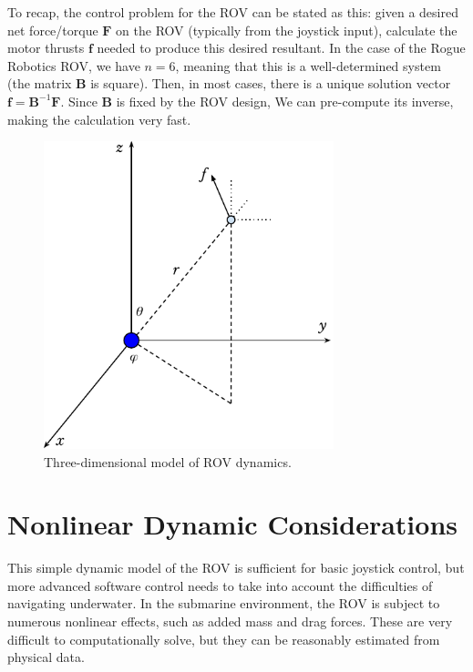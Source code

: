 \documentclass{article}
\renewcommand{\vec}[1]{\mathbf{#1}}
\newcommand{\inv}[1]{#1^{-1}}
\begin{document}
To recap, the control problem for the ROV can be stated as this: given a desired net force/torque $\vec{F}$ on the ROV (typically from the joystick input), calculate the motor thrusts $\vec{f}$ needed to produce this desired resultant. In the case of the Rogue Robotics ROV, we have $n=6$, meaning that this is a well-determined system (the matrix $\vec{B}$ is square). Then, in most cases, there is a unique solution vector $\vec{f} = \inv{\vec{B}}\vec{F}$. Since $\vec{B}$ is fixed by the ROV design, We can pre-compute its inverse, making the calculation very fast.

\begin{figure}[ht]
  \centering
  \includegraphics[width=0.75\textwidth]{fig_3d.pdf}
  \caption{Three-dimensional model of ROV dynamics.}
  \label{3d}
\end{figure}

\section{Nonlinear Dynamic Considerations}
This simple dynamic model of the ROV is sufficient for basic joystick control, but more advanced software control needs to take into account the difficulties of navigating underwater. In the submarine environment, the ROV is subject to numerous nonlinear effects, such as added mass and drag forces. These are very difficult to computationally solve, but they can be reasonably estimated from physical data.
\end{document}
